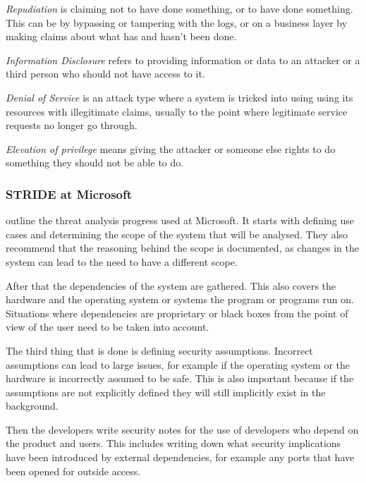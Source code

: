 \emph{Repudiation} is claiming not to have done something, or to have done something.
This can be by bypassing or tampering with the logs, or on a business layer by making claims about what has and hasn't been done.

\emph{Information Disclosure} refers to providing information or data to an attacker or a third person who should not have access to it.

\emph{Denial of Service} is an attack type where a system is tricked into using using its resources with illegitimate claims, usually to the point where legitimate service requests no longer go through.

\emph{Elevation of privilege} means giving the attacker or someone else rights to do something they should not be able to do.


\subsubsection{STRIDE at Microsoft}

\citet{microsoft_security_lifecycle} outline the threat analysis progress used at Microsoft.
It starts with defining use cases and determining the scope of the system that will be analysed. 
They also recommend that the reasoning behind the scope is documented, as changes in the system can lead to the need to have a different scope.


After that the dependencies of the system are gathered. \cite{microsoft_security_lifecycle}
This also covers the hardware and the operating system or systems the program or programs run on.
Situations where dependencies are proprietary or black boxes from the point of view of the user need to be taken into account.

The third thing that is done is defining security assumptions. \cite{microsoft_security_lifecycle}
Incorrect assumptions can lead to large issues, for example if the operating system or the hardware is incorrectly assumed to be safe.
This is also important because if the assumptions are not explicitly defined they will still implicitly exist in the background.

Then the developers write security notes for the use of developers who depend on the product and users. \cite{microsoft_security_lifecycle}
This includes writing down what security implications have been introduced by external dependencies, for example any ports that have been opened for outside access.


